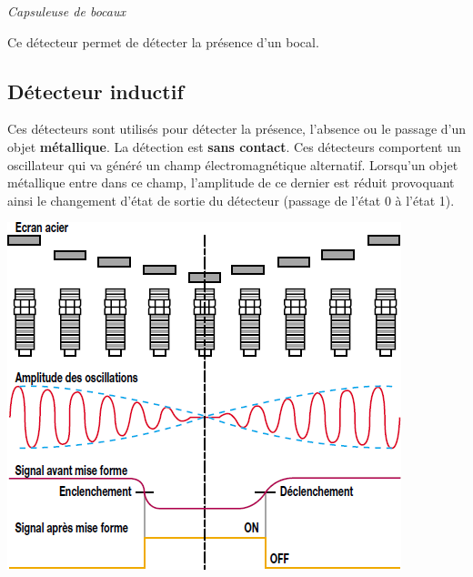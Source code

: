 \documentclass[10pt]{article}
\begin{document}
\begin{exemple}
\textit{Capsuleuse de bocaux}

Ce détecteur permet de détecter la présence d'un bocal.
\end{exemple}


\subsection{Détecteur inductif}

\begin{minipage}[c]{.5\linewidth}
Ces détecteurs sont utilisés pour détecter la présence, l'absence ou le passage d'un objet \textbf{métallique}. La détection est \textbf{sans contact}. Ces détecteurs comportent un oscillateur qui va généré un champ électromagnétique alternatif. Lorsqu'un objet métallique entre dans ce champ, l'amplitude de ce dernier est réduit provoquant ainsi le changement d'état de sortie du détecteur (passage de l'état 0 à l'état 1).
\end{minipage}\hfill
\begin{minipage}[c]{.45\linewidth}
\begin{center}
 \includegraphics[width=.9\textwidth]{images/deductif_2}
\end{center}
\end{minipage}
\end{document}
